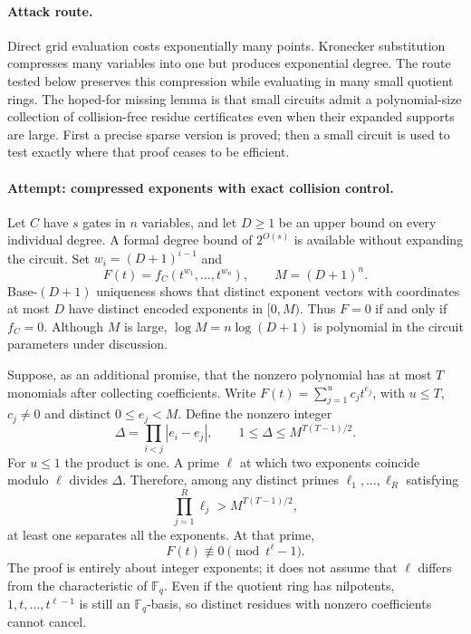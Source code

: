 \documentclass[11pt,a4paper]{article}
\numberwithin{equation}{section}
\newcommand{\F}{\mathbb{F}}
\begin{document}
\paragraph{Attack route.}
Direct grid evaluation costs exponentially many points. Kronecker
substitution compresses many variables into one but produces exponential
degree. The route tested below preserves this compression while evaluating
in many small quotient rings. The hoped-for missing lemma is that small
circuits admit a polynomial-size collection of collision-free residue
certificates even when their expanded supports are large. First a precise
sparse version is proved; then a small circuit is used to test exactly
where that proof ceases to be efficient.

\paragraph{Attempt: compressed exponents with exact collision control.}
Let $C$ have $s$ gates in $n$ variables, and let $D\geq1$ be an upper bound
on every individual degree. A formal degree bound of $2^{O(s)}$ is available
without expanding the circuit. Set $w_i=(D+1)^{i-1}$ and
\[
 F(t)=f_C(t^{w_1},\ldots,t^{w_n}),\qquad M=(D+1)^n.
\]
Base-$(D+1)$ uniqueness shows that distinct exponent vectors with coordinates
at most $D$ have distinct encoded exponents in $[0,M)$. Thus $F=0$ if and
only if $f_C=0$. Although $M$ is large, $\log M=n\log(D+1)$ is polynomial
in the circuit parameters under discussion.

Suppose, as an additional promise, that the nonzero polynomial has at most
$T$ monomials after collecting coefficients. Write
$F(t)=\sum_{j=1}^u c_jt^{e_j}$, with $u\leq T$, $c_j\ne0$ and distinct
$0\leq e_j<M$. Define the nonzero integer
\[
 \Delta=\prod_{i<j}|e_i-e_j|,
 \qquad 1\leq\Delta\leq M^{T(T-1)/2}.
\]
For $u\leq1$ the product is one. A prime $\ell$ at which two exponents
coincide modulo $\ell$ divides $\Delta$. Therefore, among any distinct
primes $\ell_1,\ldots,\ell_R$ satisfying
\begin{equation}\label{eq70:product}
 \prod_{j=1}^R\ell_j>M^{T(T-1)/2},
\end{equation}
at least one separates all the exponents. At that prime,
\begin{equation}\label{eq70:quotient}
 F(t)\not\equiv0\pmod{t^\ell-1}.
\end{equation}
The proof is entirely about integer exponents; it does not assume that
$\ell$ differs from the characteristic of $\F_q$. Even if the quotient ring
has nilpotents, $1,t,\ldots,t^{\ell-1}$ is still an $\F_q$-basis, so distinct
residues with nonzero coefficients cannot cancel.
\end{document}
